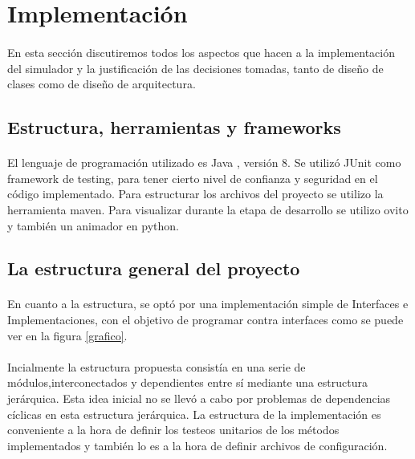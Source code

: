 \documentclass{article}
\begin{document}
\section{Implementación}

\paragraph{}
En esta sección discutiremos todos los aspectos que hacen a la implementación del simulador y la justificación de las decisiones tomadas, tanto de diseño de clases como de diseño de arquitectura.

\subsection{Estructura, herramientas y frameworks}
\paragraph{}
El lenguaje de programación utilizado es Java , versión 8. Se utilizó JUnit como framework de testing, para tener cierto nivel de confianza y seguridad en el código implementado. Para estructurar los archivos del proyecto se utilizo la herramienta maven. Para visualizar durante la etapa de desarrollo se utilizo ovito y también un animador en python.

\subsection{La estructura general del proyecto}

\paragraph{}
En cuanto a la estructura, se optó por una implementación simple de Interfaces e Implementaciones, con el objetivo de programar contra interfaces como se puede ver en la figura \ref{grafico}. 

\paragraph{}
Incialmente la estructura propuesta consistía en una serie de módulos,interconectados y dependientes entre sí mediante una estructura jerárquica. Esta idea inicial no se llevó a cabo por problemas de dependencias cíclicas en esta estructura jerárquica. La estructura de la implementación es conveniente a la hora de definir los testeos unitarios de los métodos implementados y también lo es a la hora de definir archivos de configuración. 
\end{document}
